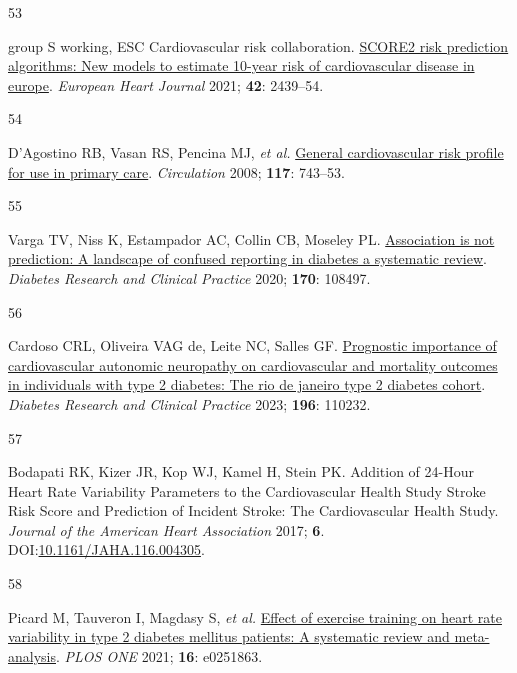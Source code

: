 \documentclass[
  a4paper,
  headsepline=true,
  open=any]{scrbook}
\newlength{\cslhangindent}
\newlength{\csllabelwidth}
\newlength{\cslentryspacingunit} %
\newenvironment{CSLReferences}[2] %
 {%
  \setlength{\parindent}{0pt}
  \ifodd #1
  \let\oldpar\par
  \def\par{\hangindent=\cslhangindent\oldpar}
  \fi
  \setlength{\parskip}{#2\cslentryspacingunit}
 }%
 {}
\newcommand{\CSLLeftMargin}[1]{\parbox[t]{\csllabelwidth}{#1}}
\newcommand{\CSLRightInline}[1]{\parbox[t]{\linewidth - \csllabelwidth}{#1}\break}
\begin{document}
\begin{CSLReferences}{0}{0}
\leavevmode{}%
\CSLLeftMargin{53 }%
\CSLRightInline{group S working, ESC Cardiovascular risk collaboration.
\href{https://doi.org/10.1093/eurheartj/ehab309}{SCORE2 risk prediction
algorithms: New models to estimate 10-year risk of cardiovascular
disease in europe}. \emph{European Heart Journal} 2021; \textbf{42}:
2439--54.}

\leavevmode{}%
\CSLLeftMargin{54 }%
\CSLRightInline{D'Agostino RB, Vasan RS, Pencina MJ, \emph{et al.}
\href{https://doi.org/10.1161/CIRCULATIONAHA.107.699579}{General
cardiovascular risk profile for use in primary care}. \emph{Circulation}
2008; \textbf{117}: 743--53.}

\leavevmode{}%
\CSLLeftMargin{55 }%
\CSLRightInline{Varga TV, Niss K, Estampador AC, Collin CB, Moseley PL.
\href{https://doi.org/10.1016/j.diabres.2020.108497}{Association is not
prediction: A landscape of confused reporting in diabetes {\textendash}
a systematic review}. \emph{Diabetes Research and Clinical Practice}
2020; \textbf{170}: 108497.}

\leavevmode{}%
\CSLLeftMargin{56 }%
\CSLRightInline{Cardoso CRL, Oliveira VAG de, Leite NC, Salles GF.
\href{https://doi.org/10.1016/j.diabres.2022.110232}{Prognostic
importance of cardiovascular autonomic neuropathy on cardiovascular and
mortality outcomes in individuals with type 2 diabetes: The rio de
janeiro type 2 diabetes cohort}. \emph{Diabetes Research and Clinical
Practice} 2023; \textbf{196}: 110232.}

\leavevmode{}%
\CSLLeftMargin{57 }%
\CSLRightInline{Bodapati RK, Kizer JR, Kop WJ, Kamel H, Stein PK.
Addition of 24-Hour Heart Rate Variability Parameters to the
Cardiovascular Health Study Stroke Risk Score and Prediction of Incident
Stroke: The Cardiovascular Health Study. \emph{Journal of the American
Heart Association} 2017; \textbf{6}.
DOI:\href{https://doi.org/10.1161/JAHA.116.004305}{10.1161/JAHA.116.004305}.}

\leavevmode{}%
\CSLLeftMargin{58 }%
\CSLRightInline{Picard M, Tauveron I, Magdasy S, \emph{et al.}
\href{https://doi.org/10.1371/journal.pone.0251863}{Effect of exercise
training on heart rate variability in type 2 diabetes mellitus patients:
A systematic review and meta-analysis}. \emph{PLOS ONE} 2021;
\textbf{16}: e0251863.}


\end{CSLReferences}
\end{document}
